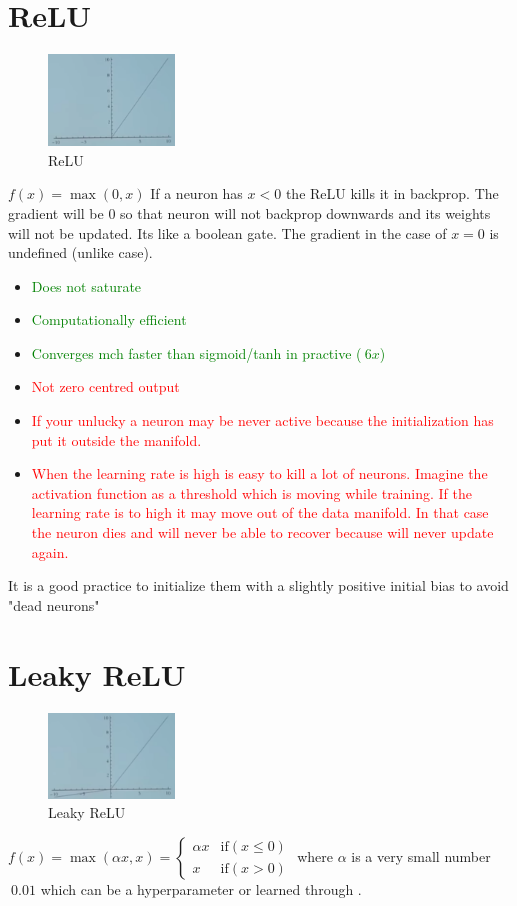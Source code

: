 \section{ReLU}
\begin{figure}[!htb]
  \centering
  \includegraphics[width=0.3\textwidth]{Images/activation_f/3.png}
  \caption{ReLU }
\end{figure}
$f(x) = \max(0,x)$ If a neuron has $x < 0$ the ReLU kills it in backprop. The gradient will be 0 so that neuron will not backprop downwards and its weights will not be updated. Its like a boolean gate. The gradient in the case of $x=0$ is undefined (unlike case).

\begin{itemize}
\item \textcolor{green}{Does not saturate}
\item \textcolor{green}{Computationally efficient}
\item \textcolor{green}{Converges mch faster than sigmoid/tanh in practive ($~6x$)}

\item \textcolor{red}{Not zero centred output}
\item \textcolor{red}{If your unlucky a neuron may be never active because the initialization has put it outside the manifold.}
\item \textcolor{red}{When the learning rate is high is easy to kill a lot of neurons. Imagine the activation function as a threshold which is moving while training. If the learning rate is to high it may move out of the data manifold. In that case the neuron dies and will never be able to recover because will never update again.}
\end{itemize}

It is a good practice to initialize them with a slightly positive initial bias to avoid "dead neurons"

\section{Leaky ReLU}
\begin{figure}[h]
  \centering
  \includegraphics[width=0.3\textwidth]{Images/activation_f/5.png}
  \caption{Leaky ReLU}
\end{figure}
$f(x) = \max(\alpha x,x) = \left\{\begin{matrix}
\alpha x & \text{if}(x\leq 0)\\ 
x & \text{if}(x>  0)
\end{matrix}\right.$
where  $\alpha$ is a very small number $~0.01$ which can be a hyperparameter or learned through .

